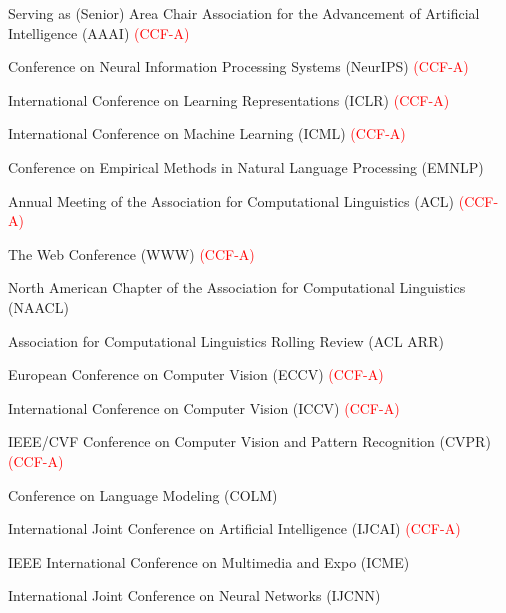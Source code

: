 \begin{rSection}{Serving as (Senior) Area Chair}
Association for the Advancement of Artificial Intelligence (AAAI) \textcolor{red}{(CCF-A)}

Conference on Neural Information Processing Systems (NeurIPS) \textcolor{red}{(CCF-A)}

International Conference on Learning Representations (ICLR) \textcolor{red}{(CCF-A)}

International Conference on Machine Learning (ICML) \textcolor{red}{(CCF-A)}

Conference on Empirical Methods in Natural Language Processing (EMNLP)

Annual Meeting of the Association for Computational Linguistics (ACL) \textcolor{red}{(CCF-A)}

The Web Conference (WWW) \textcolor{red}{(CCF-A)}

North American Chapter of the Association for Computational Linguistics (NAACL)

Association for Computational Linguistics Rolling Review (ACL ARR)

European Conference on Computer Vision (ECCV) \textcolor{red}{(CCF-A)}

International Conference on Computer Vision (ICCV) \textcolor{red}{(CCF-A)}

IEEE/CVF Conference on Computer Vision and Pattern Recognition (CVPR) \textcolor{red}{(CCF-A)}

Conference on Language Modeling (COLM)

International Joint Conference on Artificial Intelligence (IJCAI) \textcolor{red}{(CCF-A)}

IEEE International Conference on Multimedia and Expo (ICME)

International Joint Conference on Neural Networks (IJCNN)

\end{rSection}
